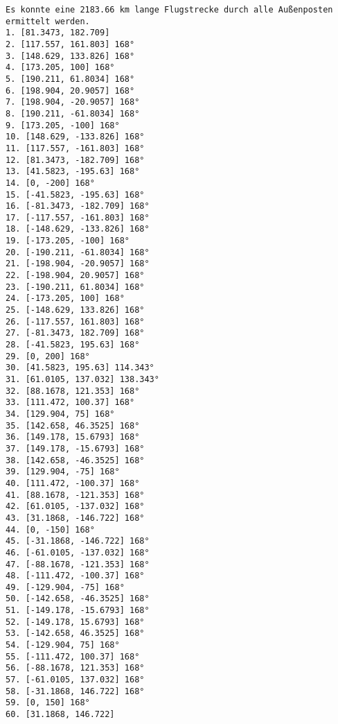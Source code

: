 \documentclass[a4paper,10pt,ngerman]{scrartcl}
\begin{document}
    \begin{lstlisting}[frame=single, title=Programmausgabe wenigerkrumm2.txt, breaklines=true,label={lst:lstlisting4}]
Es konnte eine 2183.66 km lange Flugstrecke durch alle Außenposten ermittelt werden.
1. [81.3473, 182.709]
2. [117.557, 161.803] 168°
3. [148.629, 133.826] 168°
4. [173.205, 100] 168°
5. [190.211, 61.8034] 168°
6. [198.904, 20.9057] 168°
7. [198.904, -20.9057] 168°
8. [190.211, -61.8034] 168°
9. [173.205, -100] 168°
10. [148.629, -133.826] 168°
11. [117.557, -161.803] 168°
12. [81.3473, -182.709] 168°
13. [41.5823, -195.63] 168°
14. [0, -200] 168°
15. [-41.5823, -195.63] 168°
16. [-81.3473, -182.709] 168°
17. [-117.557, -161.803] 168°
18. [-148.629, -133.826] 168°
19. [-173.205, -100] 168°
20. [-190.211, -61.8034] 168°
21. [-198.904, -20.9057] 168°
22. [-198.904, 20.9057] 168°
23. [-190.211, 61.8034] 168°
24. [-173.205, 100] 168°
25. [-148.629, 133.826] 168°
26. [-117.557, 161.803] 168°
27. [-81.3473, 182.709] 168°
28. [-41.5823, 195.63] 168°
29. [0, 200] 168°
30. [41.5823, 195.63] 114.343°
31. [61.0105, 137.032] 138.343°
32. [88.1678, 121.353] 168°
33. [111.472, 100.37] 168°
34. [129.904, 75] 168°
35. [142.658, 46.3525] 168°
36. [149.178, 15.6793] 168°
37. [149.178, -15.6793] 168°
38. [142.658, -46.3525] 168°
39. [129.904, -75] 168°
40. [111.472, -100.37] 168°
41. [88.1678, -121.353] 168°
42. [61.0105, -137.032] 168°
43. [31.1868, -146.722] 168°
44. [0, -150] 168°
45. [-31.1868, -146.722] 168°
46. [-61.0105, -137.032] 168°
47. [-88.1678, -121.353] 168°
48. [-111.472, -100.37] 168°
49. [-129.904, -75] 168°
50. [-142.658, -46.3525] 168°
51. [-149.178, -15.6793] 168°
52. [-149.178, 15.6793] 168°
53. [-142.658, 46.3525] 168°
54. [-129.904, 75] 168°
55. [-111.472, 100.37] 168°
56. [-88.1678, 121.353] 168°
57. [-61.0105, 137.032] 168°
58. [-31.1868, 146.722] 168°
59. [0, 150] 168°
60. [31.1868, 146.722]
    \end{lstlisting}
\end{document}
